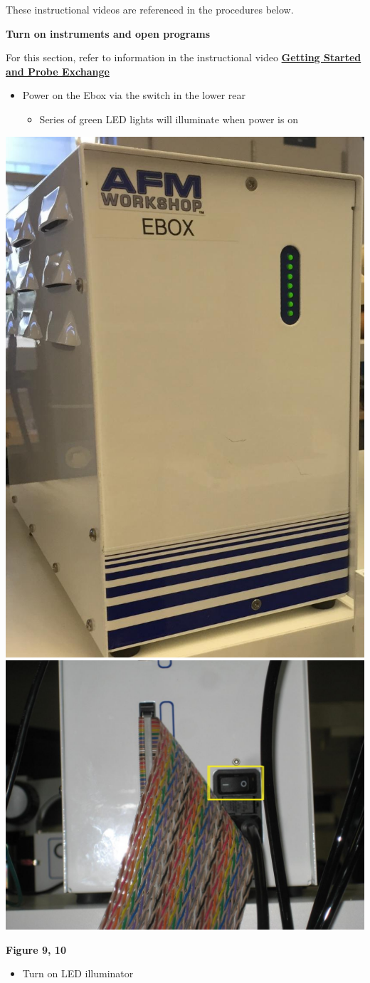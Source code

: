 \documentclass{../lab}
\begin{document}
These instructional videos are referenced in the procedures below.

\textbf{Turn on instruments and open programs}

For this section, refer to information in the instructional video  \href{http://experimentationlab.berkeley.edu/sites/default/files/gettingstarted\_final2.mp4}{\textbf{Getting Started and Probe Exchange}}

\begin{itemize}
    \item Power on the Ebox via the switch in the lower rear
    \begin{itemize}
        \item Series of green LED lights will illuminate when power is on

    \end{itemize}

\end{itemize}

\noindent
\href{http://dev-physicsadv.pantheon.berkeley.edu/sites/default/files/EBOX2.jpg}{\includegraphics[width=0.33\linewidth,keepaspectratio]{images/EBOX2.jpg}}
\href{http://dev-physicsadv.pantheon.berkeley.edu/sites/default/files/AFMImages/10.JPG}{\includegraphics[width=0.33\linewidth,keepaspectratio]{images/10.JPG}}

\textbf{Figure 9, 10}

\begin{itemize}
    \item Turn on LED illuminator

\end{itemize}
\end{document}
